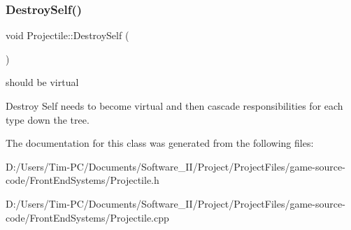 \subsubsection{\texorpdfstring{Destroy\+Self()}{DestroySelf()}}
{\footnotesize\ttfamily void Projectile\+::\+Destroy\+Self (\begin{DoxyParamCaption}{ }\end{DoxyParamCaption})\hspace{0.3cm}{\ttfamily [private]}}



should be virtual 

Destroy Self needs to become virtual and then cascade responsibilities for each type down the tree. 

The documentation for this class was generated from the following files\+:\begin{DoxyCompactItemize}
\item 
D\+:/\+Users/\+Tim-\/\+P\+C/\+Documents/\+Software\+\_\+\+I\+I/\+Project/\+Project\+Files/game-\/source-\/code/\+Front\+End\+Systems/Projectile.\+h\item 
D\+:/\+Users/\+Tim-\/\+P\+C/\+Documents/\+Software\+\_\+\+I\+I/\+Project/\+Project\+Files/game-\/source-\/code/\+Front\+End\+Systems/Projectile.\+cpp\end{DoxyCompactItemize}
